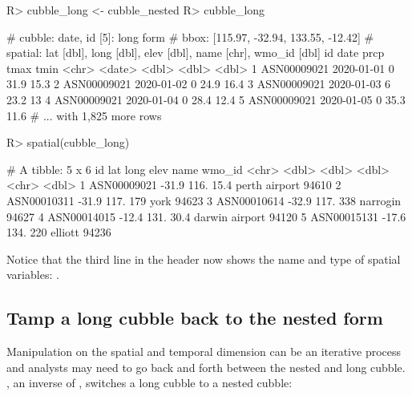 \documentclass[
]{jss}
\begin{document}
\begin{CodeChunk}
\begin{CodeInput}
R> cubble_long <- cubble_nested %
R> cubble_long
\end{CodeInput}
\begin{CodeOutput}
# cubble:  date, id [5]: long form
# bbox:    [115.97, -32.94, 133.55, -12.42]
# spatial: lat [dbl], long [dbl], elev [dbl], name [chr], wmo_id [dbl]
  id          date        prcp  tmax  tmin
  <chr>       <date>     <dbl> <dbl> <dbl>
1 ASN00009021 2020-01-01     0  31.9  15.3
2 ASN00009021 2020-01-02     0  24.9  16.4
3 ASN00009021 2020-01-03     6  23.2  13  
4 ASN00009021 2020-01-04     0  28.4  12.4
5 ASN00009021 2020-01-05     0  35.3  11.6
# ... with 1,825 more rows
\end{CodeOutput}
\begin{CodeInput}
R> spatial(cubble_long)
\end{CodeInput}
\begin{CodeOutput}
# A tibble: 5 x 6
  id            lat  long  elev name           wmo_id
  <chr>       <dbl> <dbl> <dbl> <chr>           <dbl>
1 ASN00009021 -31.9  116.  15.4 perth airport   94610
2 ASN00010311 -31.9  117. 179   york            94623
3 ASN00010614 -32.9  117. 338   narrogin        94627
4 ASN00014015 -12.4  131.  30.4 darwin airport  94120
5 ASN00015131 -17.6  134. 220   elliott         94236
\end{CodeOutput}
\end{CodeChunk}

Notice that the third line in the header now shows the name and type of
spatial variables:
.

\hypertarget{tamp-a-long-cubble-back-to-the-nested-form}{%
\subsection{Tamp a long cubble back to the nested
form}\label{tamp-a-long-cubble-back-to-the-nested-form}}

Manipulation on the spatial and temporal dimension can be an iterative
process and analysts may need to go back and forth between the nested
and long cubble. , an inverse of , switches
a long cubble to a nested cubble:
\end{document}
